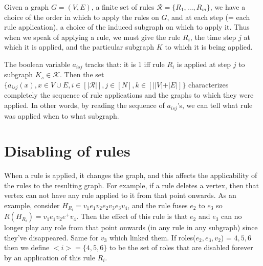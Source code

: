 \documentclass[11pt, oneside, reqno]{article}
\newcommand{\Gc}{\mathcal{G}}
\newcommand{\Kc}{\mathcal{K}}
\newcommand{\Ne}{\mathbb{N}}
\newcommand{\Rc}{\mathcal{R}}
\begin{document}
Given a graph $G = (V,E)$, a finite set of rules $\Rc = \{R_1,\ldots,R_m\}$, we have a choice of the order in which to apply the rules on $G$, and at each step (= each rule application), a choice of the induced subgraph on which to apply it.
Thus when we speak of applying a rule, we must give the rule $R_i$, the time step $j$ at which it is applied, and the particular subgraph $K$ to which it is being applied.

The boolean variable $a_{isj}$ tracks that: it is 1 iff rule $R_i$ is applied at step $j$ to subgraph $K_s \in \Kc$.
Then the set $\{a_{isj}(x), x \in V \cup E, i \in [|\Rc|], j \in [N], k \in [||V|+|E|]\}$ characterizes completely the sequence of rule applications and the graphs to which they were applied.
In other words, by reading the sequence of $a_{isj}$'s, we can tell what rule was applied when to what subgraph.
%

\section{Disabling of rules}
\label{disablingOfRules}
When a rule is applied, it changes the graph, and this affects the applicability of the rules to the resulting graph. 
For example, if a rule deletes a vertex, then that vertex can not have any rule applied to it from that point onwards. 
As an example, consider $H_{R_i} = v_1e_1v_2e_2v_3e_3v_4$, and the rule fuses $e_2$ to $e_3$ so $R(H_{R_i}) = v_1e_1v_2e^+v_4$.
Then the effect of this rule is that $e_2$ and $e_3$ can no longer play any role from that point onwards (in any rule in any subgraph) since they've disappeared. 
Same for $v_3$ which linked them.
If roles($e_2,e_3,v_2$) = $4,5,6$ then we define $<i> = \{4,5,6\}$ to be the set of roles that are disabled forever by an application of this rule $R_i$.
\end{document}
